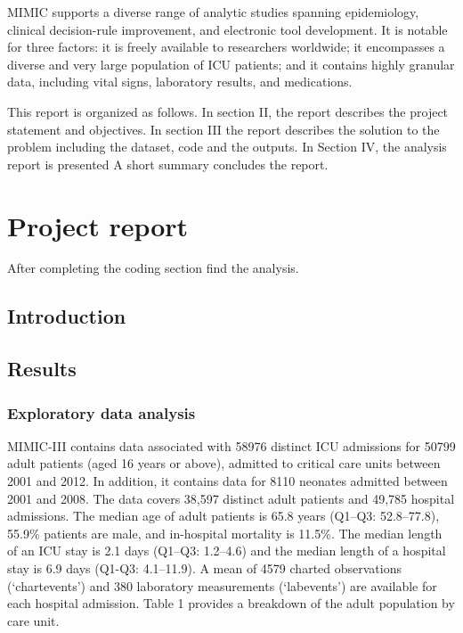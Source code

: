 \documentclass[]{interact}
\theoremstyle{plain}%
\theoremstyle{definition}
\theoremstyle{remark}
\begin{document}
MIMIC supports a diverse range of analytic studies spanning
epidemiology, clinical decision-rule improvement, and electronic tool
development. It is notable for three factors: it is freely available to
researchers worldwide; it encompasses a diverse and very large
population of ICU patients; and it contains highly granular data,
including vital signs, laboratory results, and medications.

This report is organized as follows. In section II, the report describes
the project statement and objectives. In section III the report
describes the solution to the problem including the dataset, code and
the outputs. In Section IV, the analysis report is presented A short
summary concludes the report.

\hypertarget{project-report}{%
\section{Project report}\label{project-report}}

After completing the coding section find the analysis.

\hypertarget{introduction-1}{%
\subsection{Introduction}\label{introduction-1}}

\hypertarget{results}{%
\subsection{Results}\label{results}}

\hypertarget{exploratory-data-analysis}{%
\subsubsection{Exploratory data
analysis}\label{exploratory-data-analysis}}

MIMIC-III contains data associated with 58976 distinct ICU admissions
for 50799 adult patients (aged 16 years or above), admitted to critical
care units between 2001 and 2012. In addition, it contains data for 8110
neonates admitted between 2001 and 2008. The data covers 38,597 distinct
adult patients and 49,785 hospital admissions. The median age of adult
patients is 65.8 years (Q1--Q3: 52.8--77.8), 55.9\% patients are male,
and in-hospital mortality is 11.5\%. The median length of an ICU stay is
2.1 days (Q1--Q3: 1.2--4.6) and the median length of a hospital stay is
6.9 days (Q1-Q3: 4.1--11.9). A mean of 4579 charted observations
(`chartevents') and 380 laboratory measurements (`labevents') are
available for each hospital admission. Table 1 provides a breakdown of
the adult population by care unit.
\end{document}
